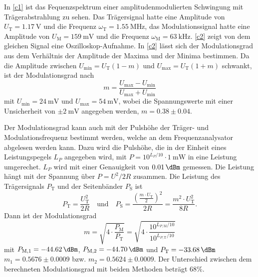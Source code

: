 In \autoref{c1} ist das Fequenzspektrum einer amplitudenmodulierten Schwingung mit Trägerabstrahlung zu sehen. Das Trägersignal hatte eine Amplitude von $U_\text{T}=\SI{1.17}{\volt}$ und die Frequenz $\omega_\text{T}=\SI{1.55}{\mega\hertz}$, das Modulationssignal hatte eine Amplitude von $U_\text{M}=\SI{159}{\milli\volt}$ und die Frequenz $\omega_\text{M}=\SI{63}{\kilo\hertz}$. \autoref{c2} zeigt von dem gleichen Signal eine Oszilloskop-Aufnahme. In \autoref{c2} lässt sich der Modulationsgrad aus dem Verhältnis der Amplitude der Maxima und der Minima bestimmen. Da die Amplitude zwischen $U_\text{min} = U_\text{T}(1 - m)$ und $U_\text{max} = U_\text{T}(1 + m)$ schwankt, ist der Modulationsgrad nach
\[
	m = \frac{U_\text{max} - U_\text{min}}{U_\text{max} + U_\text{min}}
\]
mit $U_\text{min} = \SI{24}{\milli\volt}$ und $U_\text{max} = \SI{54}{\milli\volt}$, wobei die Spannungswerte mit einer Unsicherheit von $\pm \SI{2}{\milli\volt}$ angegeben werden, $m = 0.38 \pm 0.04$.\par
\indent Der Modulationsgrad kann auch mit der Pulshöhe der Träger- und Modulationsfrequenz bestimmt werden, welche an dem Frequenzanalysator abgelesen werden kann. Dazu wird die Pulshöhe, die in der Einheit eines Leistungspegels $L_P$ angegeben wird, mit $P = 10^{L_P/10} \cdot \SI{1}{\milli\watt}$ in eine Leistung umgerechet. $L_P$ wird mit einer Genauigkeit von $\SI{0.01}{\dBm}$ gemessen. Die Leistung hängt mit der Spannung über $P = U^2/2R$ zusammen. Die Leistung des Trägersignals $P_\text{T}$ und der Seitenbänder $P_\text{S}$ ist
\[
P_\text{T} = \frac{U_\text{T}^2}{2R} \quad \text{und} \quad P_\text{S} = \frac{\left(\frac{m \cdot U_\text{T}}{2}\right)^2}{2R} = \frac{m^2 \cdot {U_\text{T}^2}}{8R}.
\]
Dann ist der Modulationsgrad
\[
	m = \sqrt{4 \cdot \frac{P_\text{M}}{P_\text{T}}} = \sqrt{4 \cdot \frac{10^{L_{P,\text{M}}/10}}{10^{L_{P,\text{T}}/10}}}
\]
mit $P_\text{M,1} = \SI{-44.62}{\dBm}$, $P_\text{M,2} = \SI{-44.70}{\dBm}$ und $P_\text{T} = \SI{-33.68}{\dBm}$ $m_1 = 0.5676 \pm 0.0009$ bzw. $m_2 = 0.5624 \pm 0.0009$.
Der Unterschied zwischen dem berechneten Modulationsgrad mit beiden Methoden beträgt 68\%.

